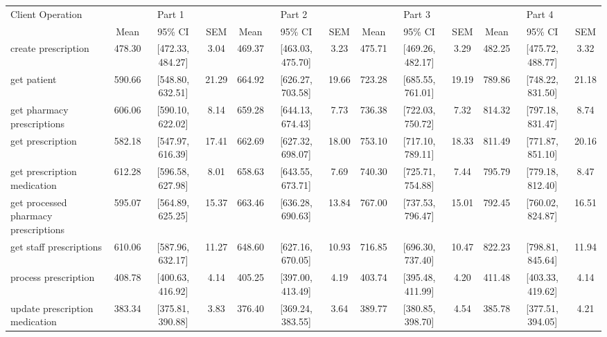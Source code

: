 \begin{tabular}{l|ccc|ccc|ccc|ccc}
\hline
Client Operation & \multicolumn{3}{c}{Part 1} & \multicolumn{3}{c}{Part 2} & \multicolumn{3}{c}{Part 3} & \multicolumn{3}{c}{Part 4} \\
  & Mean & 95\% CI & SEM & Mean & 95\% CI & SEM & Mean & 95\% CI & SEM & Mean & 95\% CI & SEM \\
\hline
 create prescription & 478.30 & [472.33, 484.27] & 3.04 & 469.37 & [463.03, 475.70] & 3.23 & 475.71 & [469.26, 482.17] & 3.29 & 482.25 & [475.72, 488.77] & 3.32 \\
 get patient & 590.66 & [548.80, 632.51] & 21.29 & 664.92 & [626.27, 703.58] & 19.66 & 723.28 & [685.55, 761.01] & 19.19 & 789.86 & [748.22, 831.50] & 21.18 \\
 get pharmacy prescriptions & 606.06 & [590.10, 622.02] & 8.14 & 659.28 & [644.13, 674.43] & 7.73 & 736.38 & [722.03, 750.72] & 7.32 & 814.32 & [797.18, 831.47] & 8.74 \\
 get prescription & 582.18 & [547.97, 616.39] & 17.41 & 662.69 & [627.32, 698.07] & 18.00 & 753.10 & [717.10, 789.11] & 18.33 & 811.49 & [771.87, 851.10] & 20.16 \\
 get prescription medication & 612.28 & [596.58, 627.98] & 8.01 & 658.63 & [643.55, 673.71] & 7.69 & 740.30 & [725.71, 754.88] & 7.44 & 795.79 & [779.18, 812.40] & 8.47 \\
 get processed pharmacy prescriptions & 595.07 & [564.89, 625.25] & 15.37 & 663.46 & [636.28, 690.63] & 13.84 & 767.00 & [737.53, 796.47] & 15.01 & 792.45 & [760.02, 824.87] & 16.51 \\
 get staff prescriptions & 610.06 & [587.96, 632.17] & 11.27 & 648.60 & [627.16, 670.05] & 10.93 & 716.85 & [696.30, 737.40] & 10.47 & 822.23 & [798.81, 845.64] & 11.94 \\
 process prescription & 408.78 & [400.63, 416.92] & 4.14 & 405.25 & [397.00, 413.49] & 4.19 & 403.74 & [395.48, 411.99] & 4.20 & 411.48 & [403.33, 419.62] & 4.14 \\
 update prescription medication & 383.34 & [375.81, 390.88] & 3.83 & 376.40 & [369.24, 383.55] & 3.64 & 389.77 & [380.85, 398.70] & 4.54 & 385.78 & [377.51, 394.05] & 4.21 \\
\hline
\end{tabular}
